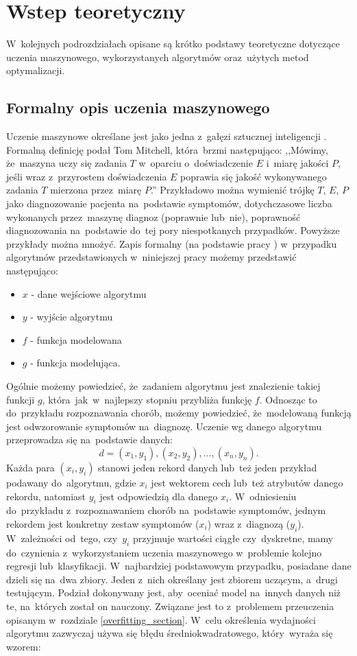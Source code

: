 \section{Wstep teoretyczny} \label{theory}
W~kolejnych podrozdziałach opisane są krótko podstawy teoretyczne dotyczące uczenia maszynowego, wykorzystanych algorytmów oraz~użytych metod optymalizacji.
\subsection{Formalny opis uczenia maszynowego}
Uczenie maszynowe określane jest jako jedna z~gałęzi sztucznej inteligencji \cite{dnn1}. Formalną definicję podał Tom Mitchell, która~brzmi następująco: ,,Mówimy, że~maszyna uczy się zadania $T$ w~oparciu o~doświadczenie $E$ i~miarę jakości $P$, jeśli wraz z~przyrostem doświadczenia $E$ poprawia się jakość wykonywanego zadania $T$ mierzona przez~miarę $P$.''\cite{mitchel} Przykładowo można wymienić trójkę $T$, $E$, $P$ jako diagnozowanie pacjenta na~podstawie symptomów, dotychczasowe  liczba wykonanych przez~maszynę diagnoz (poprawnie lub~nie),  poprawność diagnozowania na~podstawie do~tej pory niespotkanych przypadków. Powyższe przykłady można mnożyć. Zapis formalny (na podstawie pracy \cite{formal2}) w~przypadku algorytmów przedstawionych w~niniejszej pracy możemy przedstawić następująco:
\begin{itemize}
\item $x$ - dane wejściowe algorytmu
\item $y$ - wyjście algorytmu
\item $f$ - funkcja modelowana
\item $g$ - funkcja modelująca.
\end{itemize}
Ogólnie możemy powiedzieć, że~zadaniem algorytmu jest znalezienie takiej funkcji $g$, która~jak~w~najlepszy stopniu przybliża funkcję $f$. Odnosząc to do~przykładu rozpoznawania chorób, możemy powiedzieć, że~modelowaną funkcją jest odwzorowanie symptomów na~diagnozę. Uczenie wg danego algorytmu przeprowadza się na~podstawie danych:
\begin{equation}
d = (x_1,y_1), (x_2, y_2), ..., (x_n, y_n).
\end{equation}
Każda para $(x_i, y_i)$ stanowi jeden rekord danych lub~też jeden przykład podawany do~algorytmu, gdzie $x_i$ jest wektorem cech lub~też atrybutów danego rekordu, natomiast $y_i$ jest odpowiedzią dla danego $x_i$. W~odniesieniu do~przykładu z~rozpoznawaniem chorób na~podstawie symptomów, jednym rekordem jest konkretny zestaw symptomów ($x_i$) wraz z~diagnozą ($y_i$). W~zależności od~tego, czy~$y_i$ przyjmuje wartości ciągłe czy~dyskretne, mamy do~czynienia z~wykorzystaniem uczenia maszynowego w~problemie kolejno regresji lub~klasyfikacji. W~najbardziej podstawowym przypadku, posiadane dane dzieli się na~dwa zbiory. Jeden z~nich określany jest zbiorem uczącym, a~drugi testującym. Podział dokonywany jest, aby~oceniać model na~innych danych niż te, na~których został on nauczony. Związane jest to z~problemem przeuczenia opisanym w~rozdziale \ref{overfitting_section}. W~celu określenia wydajności algorytmu zazwyczaj używa się błędu średniokwadratowego, który~wyraża się wzorem:
